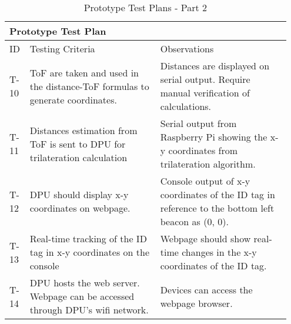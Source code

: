 \begin{table}[h!]
    \centering
    \begin{tabular}{|m{0.05\linewidth}|m{0.45\linewidth}|m{0.45\linewidth}|} 
    \hline
    \multicolumn{3}{|l|}{\textbf{Prototype Test Plan}}           \\ 
    \hline
    ID & Testing Criteria & Observations       \\ 
    \hline
    
    T-10
    & ToF are taken and used in the distance-ToF formulas to generate coordinates.
    & Distances are displayed on serial output. Require manual verification of calculations.  \\ 
    \hline    
    
    T-11
    & Distances estimation from ToF is sent to DPU for trilateration calculation
    & Serial output from Raspberry Pi showing the x-y coordinates from trilateration algorithm.    \\ 
    \hline
    
    T-12
    & DPU should display x-y coordinates on webpage.
    & Console output of x-y coordinates of the ID tag in reference to the bottom left beacon as (0, 0).    \\ 
    \hline

    T-13
    & Real-time tracking of the ID tag in x-y coordinates on the console
    & Webpage should show real-time changes in the x-y coordinates of the ID tag.       \\ 
    \hline 
    
    T-14
    & DPU hosts the web server. Webpage can be accessed through DPU's wifi network.
    & Devices can access the webpage browser.     \\ 
    \hline   

\end{tabular}
    \caption{Prototype Test Plans - Part 2}
\end{table}


